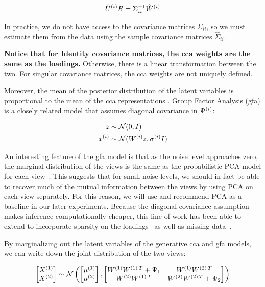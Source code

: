\begin{align}
    \hat{U}^{(i)}R = \Sigma_{ii}^{-1} \hat{W}^{(i)}
\end{align}

In practice, we do not have access to the covariance matrices $\Sigma_{ii}$, so we must estimate them from the data using the sample covariance matrices $\hat{\Sigma}_{ii}$.

\textbf{Notice that for Identity covariance matrices, the \acrshort{cca} weights are the same as the loadings.}
Otherwise, there is a linear transformation between the two.
For singular covariance matrices, the \acrshort{cca} weights are not uniquely defined.

Moreover, the mean of the posterior distribution of the latent variables is proportional to the mean of the \acrshort{cca} representations \citep{klami2013bayesian}.
Group Factor Analysis (\acrshort{gfa}) is a closely related model that assumes diagonal covariance in $\Psi^{(i)}$:

\begin{align}
    z& \sim \mathcal{N}(0, I)\\
    x^{(i)} & \sim \mathcal{N}(W^{(i)} z, \sigma^{(i)}I)
\end{align}

An interesting feature of the \acrshort{gfa} model is that as the noise level approaches zero, the marginal distribution of the views is the same as the probabilistic PCA model for each view~\citep{tipping1999probabilistic}.
This suggests that for small noise levels, we should in fact be able to recover much of the mutual information between the views by using PCA on each view separately.
For this reason, we will use and recommend PCA as a baseline in our later experiments.
Because the diagonal covariance assumption makes inference computationally cheaper, this line of work has been able to extend to incorporate sparsity on the loadings~\citep{virtanen2011bayesian} as well as missing data~\citep{ferreira2022hierarchical}.

By marginalizing out the latent variables of the generative \acrshort{cca} and \acrshort{gfa} models, we can write down the joint distribution of the two views:

\begin{align}
    \begin{bmatrix}
        X^{(1)} \\ X^{(2)}
    \end{bmatrix} \sim \mathcal{N} \left( \begin{bmatrix}
                                              \mu^{(1)} \\ \mu^{(2)}
    \end{bmatrix}, \begin{bmatrix}
                       W^{(1)}W^{(1)\,T} + \Psi_1 & W^{(1)}W^{(2)\,T} \\ W^{(2)}W^{(1)\,T} & W^{(2)}W^{(2)\,T} + \Psi_2
    \end{bmatrix} \right)
\end{align}

